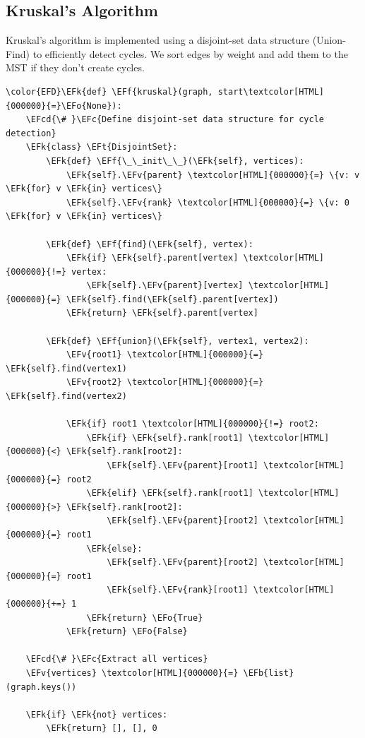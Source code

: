 \documentclass[a4paper,12pt]{article}
\newcommand{\EFc}[1]{\textcolor{EFc}{#1}} %
\newcommand{\EFcd}[1]{\textcolor{EFcd}{#1}} %
\newcommand{\EFk}[1]{\textcolor{EFk}{#1}} %
\newcommand{\EFb}[1]{\textcolor{EFb}{#1}} %
\newcommand{\EFf}[1]{\textcolor{EFf}{#1}} %
\newcommand{\EFv}[1]{\textcolor{EFv}{#1}} %
\newcommand{\EFt}[1]{\textcolor{EFt}{#1}} %
\newcommand{\EFo}[1]{\textcolor{EFo}{#1}} %
\begin{document}
\subsection{Kruskal's Algorithm}
\label{sec:orgee918c1}
Kruskal's algorithm is implemented using a disjoint-set data structure (Union-Find) to efficiently detect cycles. We sort edges by weight and add them to the MST if they don't create cycles.
\begin{listing}[htbp]
\begin{Code}
\begin{Verbatim}
\color{EFD}\EFk{def} \EFf{kruskal}(graph, start\textcolor[HTML]{000000}{=}\EFo{None}):
    \EFcd{\# }\EFc{Define disjoint-set data structure for cycle detection}
    \EFk{class} \EFt{DisjointSet}:
        \EFk{def} \EFf{\_\_init\_\_}(\EFk{self}, vertices):
            \EFk{self}.\EFv{parent} \textcolor[HTML]{000000}{=} \{v: v \EFk{for} v \EFk{in} vertices\}
            \EFk{self}.\EFv{rank} \textcolor[HTML]{000000}{=} \{v: 0 \EFk{for} v \EFk{in} vertices\}

        \EFk{def} \EFf{find}(\EFk{self}, vertex):
            \EFk{if} \EFk{self}.parent[vertex] \textcolor[HTML]{000000}{!=} vertex:
                \EFk{self}.\EFv{parent}[vertex] \textcolor[HTML]{000000}{=} \EFk{self}.find(\EFk{self}.parent[vertex])
            \EFk{return} \EFk{self}.parent[vertex]

        \EFk{def} \EFf{union}(\EFk{self}, vertex1, vertex2):
            \EFv{root1} \textcolor[HTML]{000000}{=} \EFk{self}.find(vertex1)
            \EFv{root2} \textcolor[HTML]{000000}{=} \EFk{self}.find(vertex2)

            \EFk{if} root1 \textcolor[HTML]{000000}{!=} root2:
                \EFk{if} \EFk{self}.rank[root1] \textcolor[HTML]{000000}{<} \EFk{self}.rank[root2]:
                    \EFk{self}.\EFv{parent}[root1] \textcolor[HTML]{000000}{=} root2
                \EFk{elif} \EFk{self}.rank[root1] \textcolor[HTML]{000000}{>} \EFk{self}.rank[root2]:
                    \EFk{self}.\EFv{parent}[root2] \textcolor[HTML]{000000}{=} root1
                \EFk{else}:
                    \EFk{self}.\EFv{parent}[root2] \textcolor[HTML]{000000}{=} root1
                    \EFk{self}.\EFv{rank}[root1] \textcolor[HTML]{000000}{+=} 1
                \EFk{return} \EFo{True}
            \EFk{return} \EFo{False}

    \EFcd{\# }\EFc{Extract all vertices}
    \EFv{vertices} \textcolor[HTML]{000000}{=} \EFb{list}(graph.keys())

    \EFk{if} \EFk{not} vertices:
        \EFk{return} [], [], 0


\end{Verbatim}
\end{Code}
\end{listing}
\end{document}

